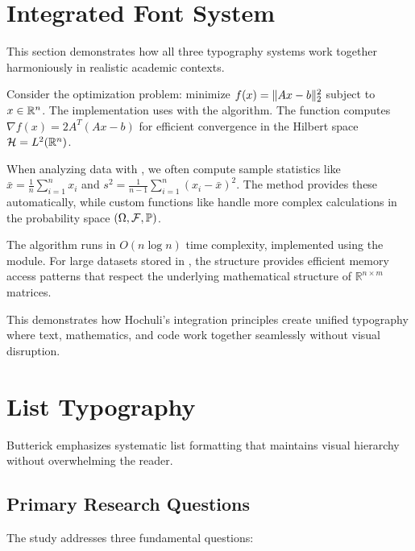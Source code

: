 \documentclass[11pt]{article}
\begin{document}
\section{Integrated Font System}

This section demonstrates how all three typography systems work together harmoniously in realistic academic contexts.

 Consider the optimization problem: minimize $f(x) = \lVert Ax - b\rVert_2^2$ subject to $x \in \mathbb{R}^n$. 
The implementation uses  with the  algorithm.
The  function computes $\nabla f(x) = 2A^T(Ax - b)$ for efficient convergence in the Hilbert space $\mathcal{H} = L^2(\mathbb{R}^n)$.

 When analyzing data with , we often compute sample statistics like $\bar{x} = \frac{1}{n}\sum_{i=1}^n x_i$ and $s^2 = \frac{1}{n - 1}\sum_{i=1}^n (x_i - \bar{x})^2$.
The  method provides these automatically, while custom functions like  handle more complex calculations in the probability space $(\Omega, \mathcal{F}, \mathbb{P})$.

 The algorithm runs in $O(n \log n)$ time complexity, implemented using the  module.
For large datasets stored in , the  structure provides efficient memory access patterns that respect the underlying mathematical structure of $\mathbb{R}^{n \times m}$ matrices.


This demonstrates how Hochuli's integration principles create unified typography where text, mathematics, and code work together seamlessly without visual disruption.

\section{List Typography}

Butterick emphasizes systematic list formatting that maintains visual hierarchy without overwhelming the reader.

\subsection{Primary Research Questions}

The study addresses three fundamental questions:
\end{document}
